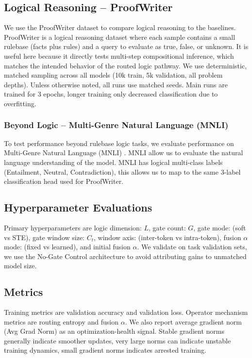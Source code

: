 \documentclass[10pt,twocolumn,letterpaper]{article}
\begin{document}
\subsection{Logical Reasoning -- ProofWriter}
We use the ProofWriter \cite{tafjord2021proofwritergeneratingimplicationsproofs}
dataset to compare logical reasoning to the baselines.
ProofWriter is a logical reasoning dataset where each sample
contains a small rulebase (facts plus rules) and a query to evaluate as true,
false, or unknown. It is useful here because it directly tests multi-step
compositional inference, which matches the
intended behavior of the routed logic pathway.
We use deterministic, matched sampling across all models
(10k train, 5k validation, all problem depths).
Unless otherwise noted, all runs use matched seeds.
Main runs are trained for 3 epochs, longer
training only decreased classification due to overfitting.

\subsubsection{Beyond Logic -- Multi-Genre Natural Language (MNLI)}
To test performance beyond rulebase logic tasks, we evaluate
performance on Multi-Genre Natural Language (MNLI) \cite{N18-1101}.
MNLI allow us to evaluate the natural language understanding
of the model. MNLI has logical multi-class labels
(Entailment, Neutral, Contradiction),
this allows us to map to the same 3-label classification
head used for ProofWriter.

\subsection{Hyperparameter Evaluations}
Primary hyperparameters are logic dimension: $L$, gate count: $G$, gate mode:
(soft vs STE), gate window size: $C_t$,
window axis: (inter-token vs intra-token), fusion $\alpha$ mode:
(fixed vs learned), and initial fusion $\alpha$.
We validate on task validation sets, we use the No-Gate Control
architecture to avoid attributing gains to unmatched model size.

\subsection{Metrics}
Training metrics are validation accuracy and validation loss.
Operator mechanism metrics are routing entropy and fusion $\alpha$.
We also report average gradient norm (Avg Grad Norm) as an optimization-health
signal. Stable gradient norms generally indicate smoother updates,
very large norms can indicate unstable training dynamics, small
gradient norms indicates arrested training.
\end{document}

